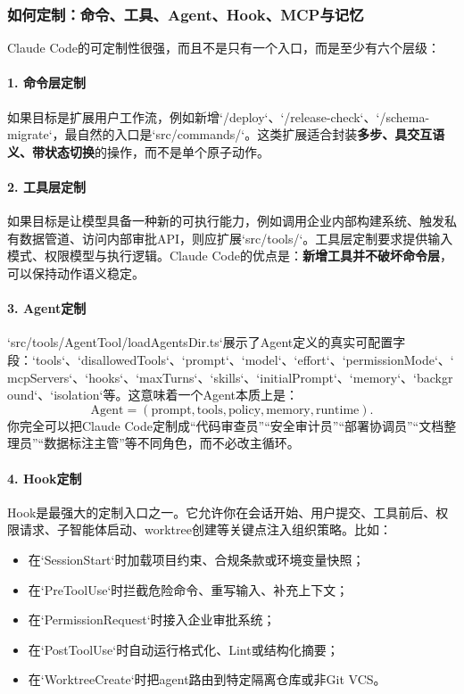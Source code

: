 \documentclass[12pt,a4paper]{article}
\begin{document}
\subsubsection{如何定制：命令、工具、Agent、Hook、MCP与记忆}

Claude Code的可定制性很强，而且不是只有一个入口，而是至少有六个层级：

\paragraph{1. 命令层定制}

如果目标是扩展用户工作流，例如新增`/deploy`、`/release-check`、`/schema-migrate`，最自然的入口是`src/commands/`。这类扩展适合封装\textbf{多步、具交互语义、带状态切换}的操作，而不是单个原子动作。

\paragraph{2. 工具层定制}

如果目标是让模型具备一种新的可执行能力，例如调用企业内部构建系统、触发私有数据管道、访问内部审批API，则应扩展`src/tools/`。工具层定制要求提供输入模式、权限模型与执行逻辑。Claude Code的优点是：\textbf{新增工具并不破坏命令层}，可以保持动作语义稳定。

\paragraph{3. Agent定制}

`src/tools/AgentTool/loadAgentsDir.ts`展示了Agent定义的真实可配置字段：`tools`、`disallowedTools`、`prompt`、`model`、`effort`、`permissionMode`、`mcpServers`、`hooks`、`maxTurns`、`skills`、`initialPrompt`、`memory`、`background`、`isolation`等。这意味着一个Agent本质上是：
\begin{equation}
\text{Agent} = (\text{prompt}, \text{tools}, \text{policy}, \text{memory}, \text{runtime}).
\end{equation}
你完全可以把Claude Code定制成“代码审查员”“安全审计员”“部署协调员”“文档整理员”“数据标注主管”等不同角色，而不必改主循环。

\paragraph{4. Hook定制}

Hook是最强大的定制入口之一。它允许你在会话开始、用户提交、工具前后、权限请求、子智能体启动、worktree创建等关键点注入组织策略。比如：
\begin{itemize}
    \item 在`SessionStart`时加载项目约束、合规条款或环境变量快照；
    \item 在`PreToolUse`时拦截危险命令、重写输入、补充上下文；
    \item 在`PermissionRequest`时接入企业审批系统；
    \item 在`PostToolUse`时自动运行格式化、Lint或结构化摘要；
    \item 在`WorktreeCreate`时把agent路由到特定隔离仓库或非Git VCS。
\end{itemize}
\end{document}
